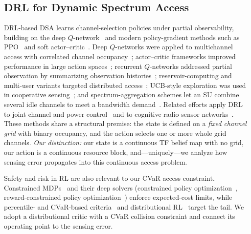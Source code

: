 \documentclass[journal]{IEEEtran}
\begin{document}
\subsection{DRL for Dynamic Spectrum Access}
DRL-based DSA learns channel-selection policies under partial observability,
building on the deep $Q$-network~\cite{mnih2015human} and modern
policy-gradient methods such as PPO~\cite{schulman2017ppo} and soft
actor--critic~\cite{haarnoja2018sac}. Deep $Q$-networks were applied to
multichannel access with correlated channel occupancy~\cite{wang2018};
actor--critic frameworks improved performance in large action
spaces~\cite{zhong2019}; recurrent $Q$-networks addressed partial observation
by summarizing observation histories~\cite{xu2020partial,hausknecht2015drqn,
xu2021deep}; reservoir-computing and multi-user variants targeted distributed
access~\cite{chang2019distributive,naparstek2018deep}; UCB-style exploration was used in cooperative sensing~\cite{zhang2019deep}; and
spectrum-aggregation schemes let an SU combine several idle channels to meet a
bandwidth demand~\cite{li2020aggregation}. Related efforts apply DRL to joint
channel and power control~\cite{tan2020deep} and to cognitive radio sensor
networks~\cite{lin2019deep}. These methods share a structural premise: the
state is defined on a \emph{fixed channel grid} with binary occupancy, and the
action selects one or more whole grid channels. \emph{Our distinction:} our
state is a continuous TF belief map with no grid, our action is a continuous
resource block, and---uniquely---we analyze how sensing error propagates into
this continuous access problem.

Safety and risk in RL are also relevant to our CVaR access constraint.
Constrained MDPs~\cite{altman1999constrained} and their deep solvers
(constrained policy optimization~\cite{achiam2017cpo}, reward-constrained
policy optimization~\cite{tessler2019reward}) enforce expected-cost limits,
while percentile- and CVaR-based criteria~\cite{chow2017risk,rockafellar2000cvar}
and distributional RL~\cite{bellemare2017distributional,dabney2018qrdqn,
ma2020dsac} target the tail. We adopt a distributional critic with a CVaR
collision constraint and connect its operating point to the sensing error.
\end{document}
